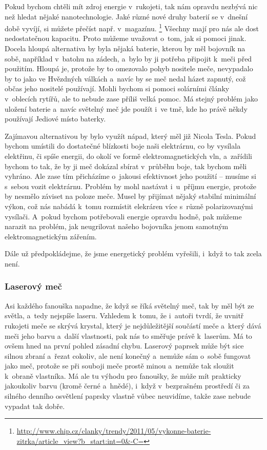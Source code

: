 {Pokud bychom chtěli mít zdroj energie v~rukojeti, tak nám opravdu nezbývá nic 
než hledat nějaké nanotechnologie. Jaké různé nové druhy baterií se v~dnešní
době vyvíjí, si můžete přečíst např. v~magazínu.%
\footnote{\url{http://www.chip.cz/clanky/trendy/2011/05/vykonne-baterie-zitrka/article_view?b_start:int=0&-C=}}
Všechny mají pro nás ale dost nedostatečnou kapacitu. Proto můžeme uvažovat
o~tom, jak si pomoci jinak. Docela hloupá alternativa by byla nějaká baterie, 
kterou by měl bojovník na sobě, například v~batohu na zádech, a~bylo by ji 
potřeba připojit k~meči před použitím. Hloupá je, protože by to omezovalo
pohyb nositele meče, nevypadalo by to jako ve Hvězdných válkách a~navíc by
se meč nedal házet zapnutý, což občas jeho nositelé používají. Mohli bychom si
pomoci solárními články v~oblecích rytířů, ale to nebude zase příliš velká 
pomoc. Má stejný problém jako uložení baterie a~navíc světelný meč jde použít 
i~ve tmě, kde ho právě někdy používají Jediové místo baterky.

Zajímavou alternativou by bylo využít nápad, který měl již Nicola Tesla. 
Pokud bychom umístili do dostatečné blízkosti boje naši elektrárnu, co by 
vysílala elektřinu, či spíše energii, do okolí ve formě elektromagnetických 
vln, a~zařídili 
bychom to tak, že by ji meč dokázal sbírat v~průběhu boje, tak bychom měli 
vyhráno. Ale zase tím přicházíme o~jakousi efektivnost jeho použití -- musíme
si s~sebou vozit elektrárnu. Problém by mohl nastávat i~u~příjmu energie, 
protože by nesmělo záviset na poloze meče. Musel by přijímat nějaký stabilní
minimální výkon, což nás nabádá k~tomu rozmístit elekráren více s~různě 
polarizovanými vysílači. A~pokud bychom potřebovali energie opravdu hodně,
pak můžeme narazit na problém, jak neugrilovat našeho bojovníka jenom
samotným elektromagnetickým zářením.

Dále už předpokládejme, že jsme energetický problém vyřešili, i~když to tak 
zcela není.

\subsubsection{Laserový meč}
Asi každého fanouška napadne, že když se říká světelný meč, tak by měl být ze 
světla, a~tedy nejspíše laseru. Vzhledem k~tomu, že i~autoři tvrdí, že 
uvnitř rukojeti meče se skrývá krystal, který je nejdůležitější součástí meče
a~který dává meči jeho barvu a~další vlastnosti, pak nás to směřuje právě
k~laserům. Má to ovšem hned na první pohled zásadní chybu. Laserový paprsek 
může být sice silnou zbraní a~řezat cokoliv, ale není konečný a~nemůže sám o~sobě 
fungovat jako meč, protože se při souboji meče prostě minou a~nemůže tak sloužit
k~obraně vlastníka. Má ale tu výhodu pro fanoušky, že může mít prakticky 
jakoukoliv barvu (kromě černé a~hnědé), i~když v~bezprašném prostředí či za 
silného denního osvětlení paprsky vlastně vůbec neuvidíme, takže zase nebude 
vypadat tak dobře.

}
